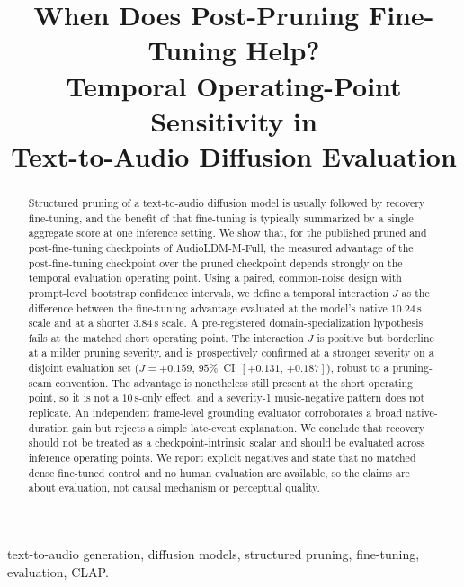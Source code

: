 \documentclass[conference]{IEEEtran}
\newcommand{\ci}[2]{[{#1},\,{#2}]}
\begin{document}
\title{When Does Post-Pruning Fine-Tuning Help?\\
Temporal Operating-Point Sensitivity in\\
Text-to-Audio Diffusion Evaluation}

\author{
}

\maketitle

\begin{abstract}
Structured pruning of a text-to-audio diffusion model is usually followed by recovery
fine-tuning, and the benefit of that fine-tuning is typically summarized by a single
aggregate score at one inference setting. We show that, for the published pruned and
post-fine-tuning checkpoints of AudioLDM-M-Full, the measured advantage of the
post-fine-tuning checkpoint over the pruned checkpoint depends strongly on the temporal
evaluation operating point. Using a paired, common-noise design with prompt-level
bootstrap confidence intervals, we define a temporal interaction $J$ as the difference
between the fine-tuning advantage evaluated at the model's native $10.24$\,s scale and at
a shorter $3.84$\,s scale. A pre-registered domain-specialization hypothesis fails at the
matched short operating point. The interaction $J$ is positive but borderline at a milder
pruning severity, and is prospectively confirmed at a stronger severity on a disjoint
evaluation set ($J=+0.159$, $95\%$~CI~$\ci{+0.131}{+0.187}$), robust to a pruning-seam
convention. The advantage is nonetheless still present at the short operating point, so it
is not a $10$\,s-only effect, and a severity-1 music-negative pattern does not replicate.
An independent frame-level grounding evaluator corroborates a broad native-duration gain
but rejects a simple late-event explanation. We conclude that recovery should not be
treated as a checkpoint-intrinsic scalar and should be evaluated across inference
operating points. We report explicit negatives and state that no matched dense
fine-tuned control and no human evaluation are available, so the claims are about
evaluation, not causal mechanism or perceptual quality.
\end{abstract}

\begin{IEEEkeywords}
text-to-audio generation, diffusion models, structured pruning, fine-tuning, evaluation,
CLAP.
\end{IEEEkeywords}
\end{document}
